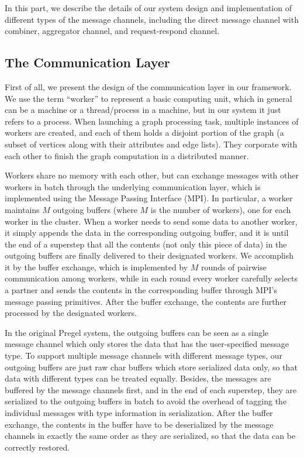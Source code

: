 \documentclass{sokendai_thesis} %
\begin{document}
In this part, we describe the details of our system design and implementation of different types of the message channels, including the direct message channel with combiner, aggregator channel, and request-respond channel.

\subsection{The Communication Layer}

First of all, we present the design of the communication layer in our framework.
We use the term ``worker'' to represent a basic computing unit, which in general can be a machine or a thread/process in a machine, but in our system it just refers to a process.
When launching a graph processing task, multiple instances of workers are created, and each of them holds a disjoint portion of the graph (a subset of vertices along with their attributes and edge lists).
They corporate with each other to finish the graph computation in a distributed manner.

Workers share no memory with each other, but can exchange messages with other workers in batch through the underlying communication layer, which is implemented using the Message Passing Interface (MPI).
In particular, a worker maintains $M$ outgoing buffers (where $M$ is the number of workers), one for each worker in the cluster.
When a worker needs to send some data to another worker, it simply appends the data in the corresponding outgoing buffer, and it is until the end of a superstep that all the contents (not only this piece of data) in the outgoing buffers are finally delivered to their designated workers.
We accomplish it by the buffer exchange, which is implemented by $M$ rounds of pairwise communication among workers, while in each round every worker carefully selects a partner and sends the contents in the corresponding buffer through MPI's message passing primitives.
After the buffer exchange, the contents are further processed by the designated workers.

In the original Pregel system, the outgoing buffers can be seen as a single message channel which only stores the data that has the user-specified message type.
To support multiple message channels with different message types, our outgoing buffers are just raw char buffers which store serialized data only, so that data with different types can be treated equally.
Besides, the messages are buffered by the message channels first, and in the end of each superstep, they are serialized to the outgoing buffers in batch to avoid the overhead of tagging the individual messages with type information in serialization.
After the buffer exchange, the contents in the buffer have to be deserialized by the message channels in exactly the same order as they are serialized, so that the data can be correctly restored.
\end{document}
